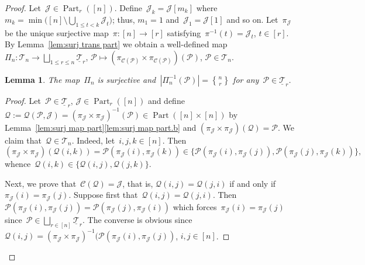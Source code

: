 \documentclass[12pt, reqno]{amsart}
\newcommand{\tstirling}[2]{\genfrac{\{}{\}}{0pt}1{#1}{#2}}
\newtheorem{lemma}[theorem]{Lemma}
\theoremstyle{definition}
\numberwithin{equation}{section}
\DeclareMathOperator{\Part}{Part}
\begin{document}
\begin{proof}
Let~$\mathcal J\in\Part_r([n])$.
Define~$\mathcal J_k=\mathcal J[m_k]$ where~$m_k=\min\big([n]
\setminus \bigcup_{1\le t<k} \mathcal J_t\big)$; thus, $m_1=1$
and~$\mathcal J_1=\mathcal J[1]$ and so on.
Let~$\pi_{\mathcal J}$ be the unique surjective map~$\pi:[n]\to[r]$
satisfying~$\pi^{-1}(t)=\mathcal J_t$, $t\in[r]$. 
By Lemma~\ref{lem:surj trans part} 
we obtain a well-defined map~$\Pi_n:\mathscr T_n\to \bigsqcup_{1\le r\le n}
\underline{\mathscr T}_r$, $\mathcal P\mapsto (\pi_{\mathcal C(\mathcal P)}\times \pi_{\mathcal C(\mathcal P)})(\mathcal P)$,
$\mathcal P\in\mathscr T_n$.
\begin{lemma}\label{lem:collapse part}
The map~$\Pi_n$ is surjective and~$|\Pi_n^{-1}(\mathcal P)|=\tstirling{n}{r}$ 
for any~$\mathcal P\in\underline{\mathscr T}_r$. 
\end{lemma}
\begin{proof}
Let~$\mathcal P\in\underline{\mathscr T}_r$, 
$\mathcal J\in\Part_r([n])$ and define~$\mathcal Q:=\mathcal Q(\mathcal P,\mathcal J)=(\pi_{\mathcal J}\times\pi_{\mathcal J})^{-1}(\mathcal P)\in \Part([n]\times[n])$ by Lemma~\ref{lem:surj map part}\ref{lem:surj map part.b} and $(\pi_{\mathcal J}\times\pi_{\mathcal J})(\mathcal Q)=\mathcal P$.
We claim that~$\mathcal Q\in \mathscr T_n$. Indeed,
let~$i,j,k\in[n]$. Then
$$
(\pi_{\mathcal J}\times\pi_{\mathcal J})(\mathcal Q(i,k))=\mathcal P(\pi_{\mathcal J}(i),\pi_{\mathcal J}(k))\in 
\{ \mathcal P(\pi_{\mathcal J}(i),\pi_{\mathcal J}(j)),\mathcal P(\pi_{\mathcal J}(j),\pi_{\mathcal J}(k))\},
$$
whence~$\mathcal Q(i,k)\in\{ \mathcal Q(i,j),
\mathcal Q(j,k)\}$. 

Next, we prove that~$\mathcal C(\mathcal Q)=\mathcal J$,
that is, $\mathcal Q(i,j)=\mathcal Q(j,i)$ if and only if~$\pi_{\mathcal J}(i)=\pi_{\mathcal J}(j)$. Suppose first that~$\mathcal Q(i,j)=\mathcal Q(j,i)$. Then $\mathcal P(\pi_{\mathcal J}(i),\pi_{\mathcal J}(j))=
\mathcal P(\pi_{\mathcal J}(j),\pi_{\mathcal J}(i))
$ which forces~$\pi_{\mathcal J}(i)=\pi_{\mathcal J}(j)$
since~$\mathcal P\in\bigsqcup_{r\in[n]}\underline{\mathscr T}_r$. 
The converse is obvious
since~$\mathcal Q(i,j)=(\pi_{\mathcal J}\times\pi_{\mathcal J})^{-1}(
\mathcal P(\pi_{\mathcal J}(i),\pi_{\mathcal J}(j))$, $i,j\in[n]$.


\end{proof}
\end{proof}
\end{document}
